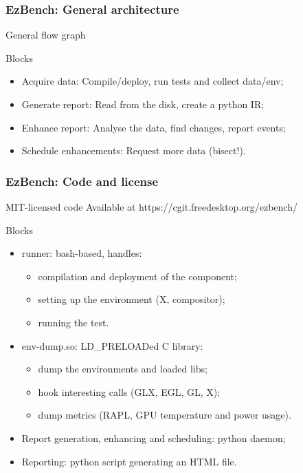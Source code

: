 \documentclass[11pt,english,compress]{beamer}
\begin{document}
\begin{frame}
	\frametitle{EzBench: General architecture}

	\begin{block}{General flow graph}
	\end{block}
	
	\pause
	
	\begin{block}{Blocks}
		\begin{itemize}
			\item Acquire data: Compile/deploy, run tests and collect data/env;
			\item Generate report: Read from the disk, create a python IR;
			\item Enhance report: Analyse the data, find changes, report events;
			\item Schedule enhancements: Request more data (bisect!).
		\end{itemize}
	\end{block}
\end{frame}

\begin{frame}
	\frametitle{EzBench: Code and license}
	\begin{block}{MIT-licensed code}
		Available at https://cgit.freedesktop.org/ezbench/
	\end{block}
	
	\pause

	\begin{block}{Blocks}
		\begin{itemize}
			\item runner: bash-based, handles:
			\begin{itemize}
				\item compilation and deployment of the component;
				\item setting up the environment (X, compositor);
				\item running the test.
			\end{itemize}
			\pause
			\item env-dump.so: LD\_PRELOADed C library:
			\begin{itemize}
				\item dump the environments and loaded libs;
				\item hook interesting calls (GLX, EGL, GL, X);
				\item dump metrics (RAPL, GPU temperature and power usage).
			\end{itemize}
			\pause
			\item Report generation, enhancing and scheduling: python daemon;
			\item Reporting: python script generating an HTML file.
		\end{itemize}
	\end{block}
\end{frame}
\end{document}
